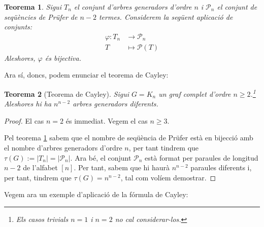 \documentclass{article}
\newtheorem{theorem}{Teorema}[section]
\begin{document}
\begin{theorem}\label{bij}
Sigui $T_n$ el conjunt d'arbres generadors d'ordre $n$ i $\mathcal{P}_n$ el conjunt de seqüències de Prüfer de $n-2$ termes. Considerem la següent aplicació de conjunts:
\begin{align*}
    \varphi:T_n&\rightarrow \mathcal{P}_n\\
    T&\mapsto \mathcal{P}(T)
\end{align*}
Aleshores, $\varphi$ és bijectiva.
\end{theorem}
Ara sí, doncs, podem enunciar el teorema de Cayley:
\begin{theorem}[Teorema de Cayley]
Sigui $G=K_n$ un graf complet d'ordre $n\geq 2$.\footnote{Els casos trivials $n=1$ i $n=2$ no cal considerar-los.} Aleshores hi ha $n^{n-2}$ arbres generadors diferents.
\end{theorem}
\begin{proof}
El cas $n=2$ és immediat. Vegem el cas $n\geq3$.\par
Pel teorema \ref{bij} sabem que el nombre de seqüència de Prüfer està en bijecció amb el nombre d'arbres generadors d'ordre $n$, per tant tindrem que $\tau(G):=|T_n|=|\mathcal{P}_n|$. Ara bé, el conjunt $\mathcal{P}_n$ està format per paraules de longitud $n-2$ de l'alfabet $[n]$. Per tant, sabem que hi haurà $n^{n-2}$ paraules diferents i, per tant, tindrem que $\tau(G)=n^{n-2}$, tal com volíem demostrar.
\end{proof}
Vegem ara un exemple d'aplicació de la fórmula de Cayley:
\end{document}
